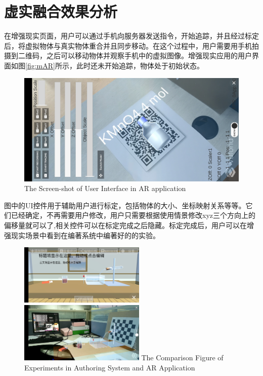 \section{虚实融合效果分析}
在增强现实页面，用户可以通过手机向服务器发送指令，开始追踪，并且经过标定后，将虚拟物体与真实物体重合并且同步移动。在这个过程中，用户需要用手机拍摄到二维码，之后可以移动物体并观察手机中的虚拟图像。增强现实应用的用户界面如图\ref{fig:mAR}所示，此时还未开始追踪，物体处于初始状态。

\begin{figure}[!htp]
  \centering
  \includegraphics[width=12cm]{figure/ARui.jpg}
    {The Screen-shot of User Interface in AR application }
 \label{fig:ARUI}
\end{figure}

图中的UI控件用于辅助用户进行标定，包括物体的大小、坐标映射关系等等。它们已经确定，不再需要用户修改，用户只需要根据使用情景修改xyz三个方向上的偏移量就可以了,相关控件可以在标定完成之后隐藏。标定完成后，用户可以在增强现实场景中看到在编著系统中编著好的的实验。
\begin{figure}[!htp]
  \centering
  \includegraphics[width=6cm]{figure/authorRes.jpg}
    \hspace{1cm}
  \includegraphics[width=6cm]{figure/table.jpg}
    {The Comparison Figure of Experiments in Authoring System and AR Application}
 \label{fig:comp}
\end{figure}

